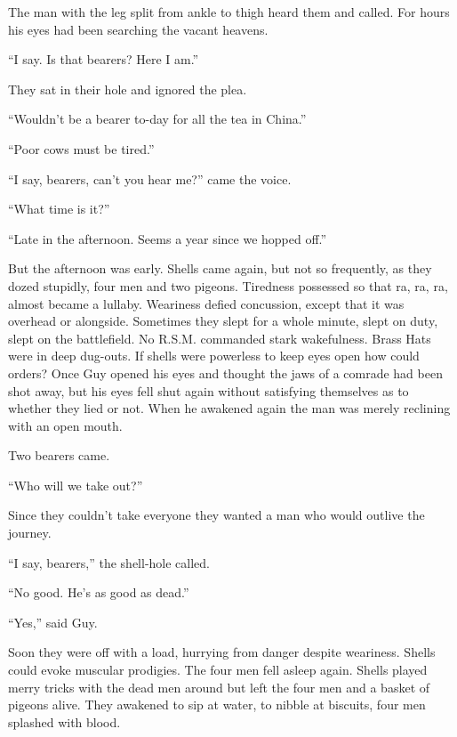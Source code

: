 The man with the leg split from ankle to thigh heard them and called. For hours his eyes had been searching the vacant heavens.

``I say. Is that bearers? Here I am.''

They sat in their hole and ignored the plea.

``Wouldn't be a bearer to-day for all the tea in China.''

``Poor cows must be tired.''

``I say, bearers, can't you hear me?'' came the voice.

``What time is it?''

``Late in the afternoon. Seems a year since we hopped off.''

But the afternoon was early. Shells came again, but not so frequently, as they dozed stupidly, four men and two pigeons. Tiredness possessed so that ra, ra, ra, almost became a lullaby. Weariness defied concussion, except that it was overhead or alongside. Sometimes they slept for a whole minute, slept on duty, slept on the battlefield. No R.S.M. commanded stark wakefulness. Brass Hats were in deep dug-outs. If shells were powerless to keep eyes open how could orders? Once Guy opened his eyes and thought the jaws of a comrade had been shot away, but his eyes fell shut again without satisfying themselves as to whether they lied or not. When he awakened again the man was merely reclining with an open mouth.

Two bearers came.

``Who will we take out?''

Since they couldn't take everyone they wanted a man who would outlive the journey.

``I say, bearers,'' the shell-hole called.

``No good. He's as good as dead.''

``Yes,'' said Guy.

Soon they were off with a load, hurrying from danger despite weariness. Shells could evoke muscular prodigies. The four men fell asleep again. Shells played merry tricks with the dead men around but left the four men and a basket of pigeons alive. They awakened to sip at water, to nibble at biscuits, four men splashed with blood.

